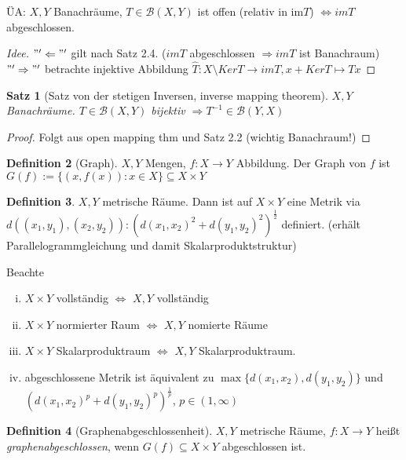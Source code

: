 \documentclass[ngerman]{report}
\theoremstyle{plain}%
\newtheorem{thm}{Satz}[chapter]
\theoremstyle{definition}%
\newtheorem{definition}[thm]{Definition}
\theoremstyle{myStyle}
\newcommand{\B}{\mathcal{B}} %
\newcommand{\BS}[1][X,Y]{\mathcal{B}(#1)} %
\newcommand{\df}[1][]{%
	\overset{#1}{\Rightarrow}
}
\newcommand{\inv}[1]{#1^{-1}}
\newcommand{\qmarks}[1]{#1}
\begin{document}
	ÜA: $X,Y$ Banachräume, $T\in \BS$ ist offen (relativ in im$T$) $\Leftrightarrow imT$ abgeschlossen. 
		\begin{proof}[Idee]
		$"'\Leftarrow"'$ gilt nach Satz 2.4. ($imT$ abgeschlossen $\df imT$ ist Banachraum)\\
		$"'\df"'$ betrachte injektive Abbildung $\hat{T}: X\setminus KerT \to imT, x+KerT\mapsto Tx$
		\end{proof}

	\begin{thm}[Satz von der stetigen Inversen, inverse mapping theorem]
	$X, Y$ Banachräume. $T\in\BS$ bijektiv $\df \inv{T}\in \B(Y,X)$	
	\end{thm}
	
	\begin{proof}
		Folgt aus open mapping thm und Satz 2.2 (wichtig Banachraum!)
	\end{proof}

	\begin{definition}[Graph]
		$X,Y$ Mengen, $f: X\to Y$ Abbildung. Der \qmarks{Graph von $f$} ist 
			$G(f) := \{(x,f(x)) : x\in X\} \subseteq X\times Y$
	\end{definition}

	\begin{definition}
		$X,Y$ metrische Räume. Dann ist auf $X\times Y$ eine Metrik via 
			$d((x_1,y_1),(x_2,y_2)) : (d(x_1,x_2)^2 + d(y_1,y_2)^2)^{\frac{1}{2}}$ definiert. (erhält Parallelogrammgleichung und damit Skalarproduktstruktur)
	\end{definition}

	Beachte 
		\begin{enumerate}[(i)]
			\item $X\times Y$ vollständig $\Leftrightarrow$ $X, Y$ vollständig
			\item $X\times Y$ normierter Raum $\Leftrightarrow$ $X,Y$ nomierte Räume
			\item $X\times Y$ Skalarproduktraum $\Leftrightarrow$ $X,Y$ Skalarproduktraum. 
			\item abgeschlossene Metrik ist äquivalent zu $\max\{d(x_1,x_2),d(y_1,y_2)\}$ und 
			$(d(x_1,x_2)^p + d(y_1,y_2)^p)^{\frac{1}{p}}$, $p\in (1,\infty)$
		\end{enumerate}

	\begin{definition}[Graphenabgeschlossenheit]
		$X,Y$ metrische Räume, $f: X\to Y$ heißt \textit{graphenabgeschlossen}, wenn $G(f) \subseteq X\times Y$ abgeschlossen ist.	
	\end{definition}
\end{document}
